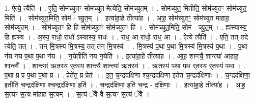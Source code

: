 \documentclass[17pt]{extarticle}
\begin{document}
1. ऐत्ये॒ त्यैति॑ । . ए॒ति॒ सोम॑च्युतꣳ॒॒ सोम॑च्युत मेत्येति॒ सोम॑च्युतम् । . सोम॑च्युत॒ मितीति॒ सोम॑च्युतꣳ॒॒ सोम॑च्युत॒ मिति॑ । . सोम॑च्युत॒मिति॒ सोम॑ - च्यु॒त॒म् । . इत्या॑हा॒हे तीत्या॑ह । . आ॒ह॒ सोम॑च्युतꣳ॒॒ सोम॑च्युत माहाह॒ सोम॑च्युतम् । . सोम॑च्युतꣳ॒॒ हि हि सोम॑च्युतꣳ॒॒ सोम॑च्युतꣳ॒॒ हि । . सोम॑च्युत॒मिति॒ सोम॑ - च्यु॒त॒म् । . ह्य॑स्यास्य॒ हि ह्य॑स्य । . अ॒स्य॒ राधो॒ राधो᳚ ऽस्यास्य॒ राधः॑ । . राध॒ आ राधो॒ राध॒ आ । . ऐत्ये त्यैति॑ । . एति॒ तत् तदे त्येति॒ तत् । . तन् मि॒त्रस्य॑ मि॒त्रस्य॒ तत् तन् मि॒त्रस्य॑ । . मि॒त्रस्य॑ प॒था प॒था मि॒त्रस्य॑ मि॒त्रस्य॑ प॒था । . प॒था न॑य नय प॒था प॒था न॑य । . न॒येतीति॑ नय न॒येति॑ । . इत्या॑हा॒हे तीत्या॑ह । . आ॒ह॒ शान्त्यै॒ शान्त्या॑ आहाह॒ शान्त्यै᳚ । . शान्त्या॑ ऋ॒तस्य॒ र्‌तस्य॒ शान्त्यै॒ शान्त्या॑ ऋ॒तस्य॑ । . ऋ॒तस्य॑ प॒था प॒थ र्‌तस्य॒ र्‌तस्य॑ प॒था । . प॒था प्र प्र प॒था प॒था प्र । . प्रेते॑त॒ प्र प्रेत॑ । . इ॒त॒ च॒न्द्रद॑क्षिणा श्च॒न्द्रद॑क्षिणा इतेत च॒न्द्रद॑क्षिणाः । . च॒न्द्रद॑क्षिणा॒ इतीति॑ च॒न्द्रद॑क्षिणा श्च॒न्द्रद॑क्षिणा॒ इति॑ । . च॒न्द्रद॑क्षिणा॒ इति॑ च॒न्द्र - द॒क्षि॒णाः॒ । . इत्या॑हा॒हे तीत्या॑ह । . आ॒ह॒ स॒त्यꣳ स॒त्य मा॑हाह स॒त्यम् । . स॒त्यं ॅवै वै स॒त्यꣳ स॒त्यं ॅवै । \newline
\end{document}
